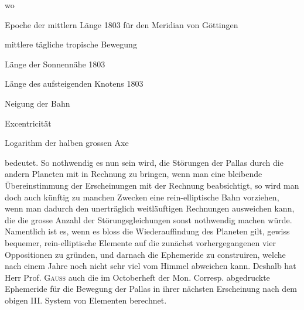 wo
\begin{description}\setlength{\itemsep}{0pt}\setlength{\parsep}{0pt}\setlength{\parskip}{0pt}
\item[$A$] Epoche der mittlern Länge 1803 für den Meridian von Göttingen
\item[$B$] mittlere tägliche tropische Bewegung
\item[$C$] Länge der Sonnennähe 1803
\item[$D$] Länge des aufsteigenden Knotens 1803
\item[$E$] Neigung der Bahn
\item[$F$] Excentricität
\item[$G$] Logarithm der halben grossen Axe
\end{description}
bedeutet. So nothwendig es nun sein wird, die Störungen der Pallas durch die
andern Planeten mit in Rechnung zu bringen, wenn man eine bleibende Übereinstimmung
der Erscheinungen mit der Rechnung beabsichtigt, so wird man doch
auch künftig zu manchen Zwecken eine rein-elliptische Bahn vorziehen, wenn
man dadurch den unerträglich weitläuftigen Rechnungen ausweichen kann, die
die grosse Anzahl der Störungsgleichungen sonst nothwendig machen würde. Namentlich
ist es, wenn es bloss die Wiederauffindung des Planeten gilt, gewiss
bequemer, rein-elliptische Elemente auf die zunächst vorhergegangenen vier Oppositionen
zu gründen, und darnach die Ephemeride zu construiren, welche nach
einem Jahre noch nicht sehr viel vom Himmel abweichen kann. Deshalb hat
Herr Prof. \textsc{Gauss} auch die im Octoberheft der Mon. Corresp. abgedruckte Ephemeride
für die Bewegung der Pallas in ihrer nächsten Erscheinung nach dem
obigen III. System von Elementen berechnet.

